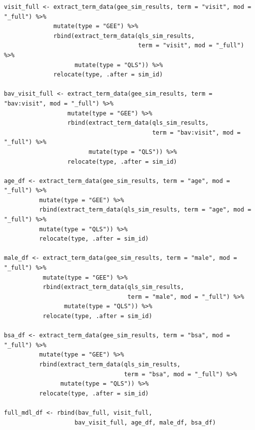 \documentclass[
]{aft}
\begin{document}
\begin{verbatim}
visit_full <- extract_term_data(gee_sim_results, term = "visit", mod = "_full") %>% 
              mutate(type = "GEE") %>%
              rbind(extract_term_data(qls_sim_results, 
                                      term = "visit", mod = "_full") %>% 
                    mutate(type = "QLS")) %>%
              relocate(type, .after = sim_id)

bav_visit_full <- extract_term_data(gee_sim_results, term = "bav:visit", mod = "_full") %>%
                  mutate(type = "GEE") %>%
                  rbind(extract_term_data(qls_sim_results, 
                                          term = "bav:visit", mod = "_full") %>% 
                        mutate(type = "QLS")) %>%
                  relocate(type, .after = sim_id)

age_df <- extract_term_data(gee_sim_results, term = "age", mod = "_full") %>% 
          mutate(type = "GEE") %>%
          rbind(extract_term_data(qls_sim_results, term = "age", mod = "_full") %>%
          mutate(type = "QLS")) %>%
          relocate(type, .after = sim_id)

male_df <- extract_term_data(gee_sim_results, term = "male", mod = "_full") %>% 
           mutate(type = "GEE") %>%
           rbind(extract_term_data(qls_sim_results, 
                                   term = "male", mod = "_full") %>% 
                 mutate(type = "QLS")) %>%
           relocate(type, .after = sim_id)

bsa_df <- extract_term_data(gee_sim_results, term = "bsa", mod = "_full") %>% 
          mutate(type = "GEE") %>%
          rbind(extract_term_data(qls_sim_results, 
                                  term = "bsa", mod = "_full") %>% 
                mutate(type = "QLS")) %>%
          relocate(type, .after = sim_id)

full_mdl_df <- rbind(bav_full, visit_full, 
                    bav_visit_full, age_df, male_df, bsa_df)


\end{verbatim}
\end{document}
